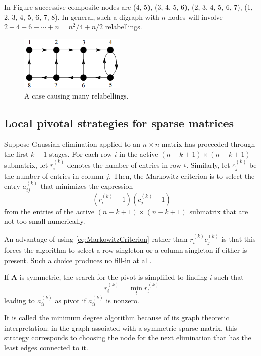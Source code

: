 \begin{exm}
  In Figure successive composite nodes are (4, 5), (3, 4, 5, 6), (2, 3,
  4, 5, 6, 7), (1, 2, 3, 4, 5, 6, 7, 8). In general, such a digraph
  with $n$ nodes will involve $2+4+6+\cdots+n=n^2/4+n/2$ relabellings.
\begin{figure}[H]
  \centering
    \includegraphics[width=5cm]{png/ManyRelabelling.png}
    \caption{A case causing many relabellings.}
    \label{fig:ManyRelabelling}
  \end{figure}
\end{exm}

\subsection{Local pivotal strategies for sparse matrices}
\label{sec:LocalPivotal}

\begin{defn}
  Suppose Gaussian elimination applied to an $n\times n$ matrix has
  proceeded through the first $k-1$ stages. For each row $i$ in the
  active $(n-k+1)\times(n-k+1)$ submatrix, let $r_i^{(k)}$ denotes the
  number of entries in row $i$. Similarly, let $c_j^{(k)}$ be the
  number of entries in column $j$. Then, the Markowitz criterion is to
  select the entry $a_{ij}^{(k)}$ that minimizes the expression
  \begin{equation}
    \label{eq:MarkowitzCriterion}
    (r_i^{(k)}-1)(c_j^{(k)}-1)
  \end{equation}
  from the entries of the active $(n-k+1)\times(n-k+1)$ submatrix that
  are not too small numerically.
\end{defn}

\begin{rmk}
  An advantage of using \eqref{eq:MarkowitzCriterion} rather than
  $r_i^{(k)}c_j^{(k)}$ is that this forces the algorithm to select a
  row singleton or a column singleton if either is present. Such a
  choice produces no fill-in at all.
\end{rmk}

\begin{thm}
 If $\mathbf{A}$ is symmetric,  the search for the pivot is simplified to
 finding $i$ such that $$r_i^{(k)}=\min\limits_tr_t^{(k)}$$ leading to
 $a_{ii}^{(k)}$ as pivot if $a_{ii}^{(k)}$ is nonzero.
\end{thm}
\begin{rmk}
  It is called the minimum degree algorithm because of its graph
  theoretic interpretation: in the graph assoiated with a symmetric
  sparse matrix, this strategy corresponds to choosing the node for
  the next elimination that has the least edges connected to it.
\end{rmk}

